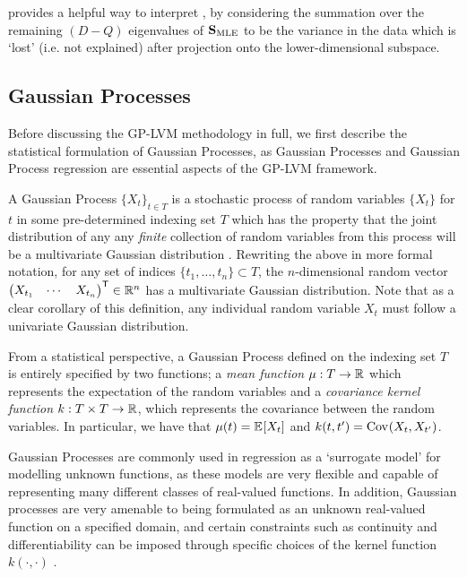 \documentclass[12pt]{article}
\numberwithin{equation}{section}
\numberwithin{figure}{section}
\numberwithin{table}{section}
\newcommand{\MLE}{\text{MLE}}
\begin{document}
\citet{PPCA-1999} provides a helpful way to interpret , by considering the summation over the remaining $(D-Q)$ eigenvalues of $\bfS_{\MLE}$ to be the variance in the data which is `lost' (i.e. not explained) after projection onto the lower-dimensional subspace. 

\subsection{Gaussian Processes} 

Before discussing the GP-LVM methodology in full, we first describe the statistical formulation of Gaussian Processes, as Gaussian Processes and Gaussian Process regression are essential aspects of the GP-LVM framework.

A Gaussian Process $\{X_{t}\}_{t \in T}$ is a stochastic process of random variables $\{X_{t}\}$ for $t$ in some pre-determined indexing set $T$ which has the property that the joint distribution of any any \emph{finite} collection of random variables from this process will be a multivariate Gaussian distribution \citep{Rasmussen-GPML-2006,GPLVM-2005}. Rewriting the above in more formal notation, for any set of indices $\{t_{1}, \dots, t_{n}\} \subset T$, the $n$-dimensional random vector $\begin{pmatrix}X_{t_{1}} & \cdots & X_{t_{n}}\end{pmatrix}^{\scriptstyle{\mathsf{T}}} \in \mathbb{R}^{n}$ has a multivariate Gaussian distribution. Note that as a clear corollary of this definition, any individual random variable $X_{t}$ must follow a univariate Gaussian distribution. 

From a statistical perspective, a Gaussian Process defined on the indexing set $T$ is entirely specified by two functions; a \emph{mean function} $\mu: T \to \mathbb{R}$ which represents the expectation of the random variables and a \emph{covariance kernel function} $k: T \times T \to \mathbb{R}$, which represents the covariance between the random variables. In particular, we have that $\mu(t) = \expec{X_{t}}$ and $k(t, t') = \covar{X_{t}}{X_{t'}}$.

Gaussian Processes are commonly used in regression as a `surrogate model' for modelling unknown functions, as these models are very flexible and capable of representing many different classes of real-valued functions. In addition, Gaussian processes are very amenable to being formulated as an unknown real-valued function on a specified domain, and certain constraints such as continuity and differentiability can be imposed through specific choices of the kernel function $k(\cdot, \cdot)$ \citep{Bayes-GPLVM-2010}. 
\end{document}
